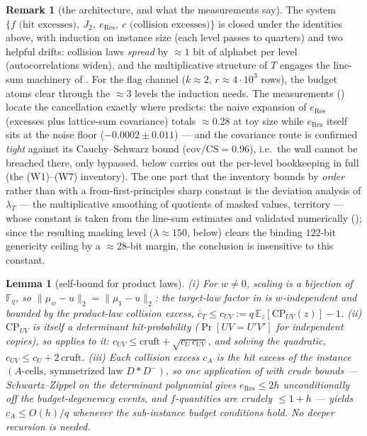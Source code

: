 \documentclass{article}
\newcommand{\Fq}{\mathbb{F}_q}
\newtheorem{lemma}[theorem]{Lemma}
\theoremstyle{definition}
\newtheorem{remark}[theorem]{Remark}
\begin{document}
\begin{remark}[the architecture, and what the measurements say]\label{rem:wall}
The system $\{f \text{ (hit excesses)},\ J_2,\ e_{\mathrm{Res}},\ c \text{ (collision excesses)}\}$ is closed under the identities above, with induction on instance size (each level passes to quarters) and two helpful drifts: collision laws \emph{spread} by $\approx 1$ bit of alphabet per level (autocorrelations widen), and the multiplicative structure of $T$ engages the line-sum machinery of . For the flag channel ($k \approx 2$, $r \approx 4 \cdot 10^3$ rows), the budget atoms clear through the $\approx 3$ levels the induction needs. The measurements () locate the cancellation exactly where  predicts: the naive expansion of $e_{\mathrm{Res}}$ (excesses plus lattice-sum covariance) totals $\approx 0.28$ at toy size while $e_{\mathrm{Res}}$ itself sits at the noise floor ($-0.0002 \pm 0.011$) --- and the covariance route is confirmed \emph{tight} against its Cauchy--Schwarz bound ($\mathrm{cov}/\mathrm{CS} = 0.96$), i.e.\ the wall cannot be breached there, only bypassed.  below carries out the per-level bookkeeping in full (the (W1)--(W7) inventory). The one part that the inventory bounds by \emph{order} rather than with a from-first-principles sharp constant is the deviation analysis of $\lambda_T$ --- the multiplicative smoothing of quotients of masked values,  territory --- whose constant is taken from the line-sum estimates and validated numerically (); since the resulting masking level ($\lambda \approx 150$, below) clears the binding $122$-bit genericity ceiling by a $\approx 28$-bit margin, the conclusion is insensitive to this constant.
\end{remark}

\begin{lemma}[self-bound for product laws]\label{lem:selfbound}
(i) For $w \neq 0$, scaling is a bijection of $\Fq$, so $\|\mu_w - u\|_2 = \|\mu_1 - u\|_2$: the target-law factor in  is $w$-independent and bounded by the product-law collision excess, $\bar c_T \leq c_{UV} := q\,\mathbb{E}_z[\mathrm{CP}_{UV}(z)] - 1$.
(ii) $\mathrm{CP}_{UV}$ is itself a determinant hit-probability ($\Pr[UV = U'V']$ for independent copies), so  applies to it: $c_{UV} \leq \mathrm{cruft} + \sqrt{c_U\, c_{UV}}$, and solving the quadratic, $c_{UV} \leq c_U + 2\,\mathrm{cruft}$.
(iii) Each collision excess $c_A$ is the hit excess of the instance $(A\text{-cells},\ \text{symmetrized law } D \ast D^-)$, so one application of  with \emph{crude} bounds --- Schwartz--Zippel on the determinant polynomial gives $e_{\mathrm{Res}} \leq 2h$ unconditionally off the budget-degeneracy events, and $f$-quantities are crudely $\leq 1 + h$ --- yields $c_A \leq O(h)/q$ whenever the sub-instance budget conditions hold. No deeper recursion is needed.
\end{lemma}
\end{document}
